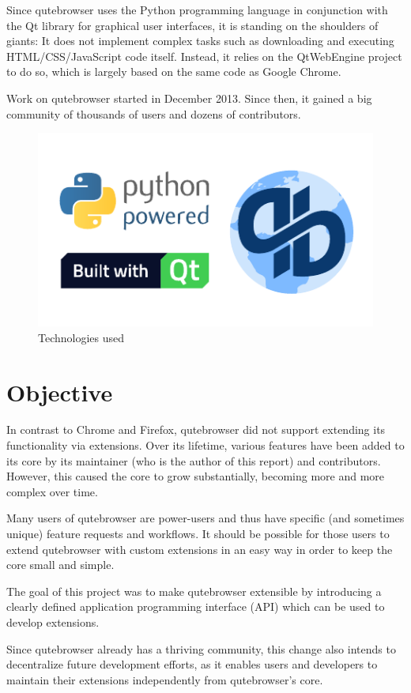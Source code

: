 Since qutebrowser uses the Python programming language in conjunction with the
Qt library for graphical user interfaces, it is standing on the shoulders of
giants: It does not implement complex tasks such as downloading and executing
HTML/CSS/JavaScript code itself. Instead, it relies on the QtWebEngine project
to do so, which is largely based on the same code as Google Chrome.

Work on qutebrowser started in December 2013. Since then, it gained a big
community of thousands of users and dozens of contributors.

\begin{figure}[H]
  \centering
  \includegraphics[width=0.7\linewidth]{img/logos.pdf}
  \caption{Technologies used}
\end{figure}

\section*{Objective}

In contrast to Chrome and Firefox, qutebrowser did not support extending its
functionality via extensions. Over its lifetime, various features have been
added to its core by its maintainer (who is the author of this report) and
contributors. However, this caused the core to grow substantially, becoming more
and more complex over time.

Many users of qutebrowser are power-users and thus have specific (and sometimes
unique) feature requests and workflows. It should be possible for those users to
extend qutebrowser with custom extensions in an easy way in order to keep the
core small and simple.

The goal of this project was to make qutebrowser extensible by introducing a
clearly defined application programming interface (API) which can be used to
develop extensions.

Since qutebrowser already has a thriving community, this change also intends to
decentralize future development efforts, as it enables users and developers to
maintain their extensions independently from qutebrowser's core.

